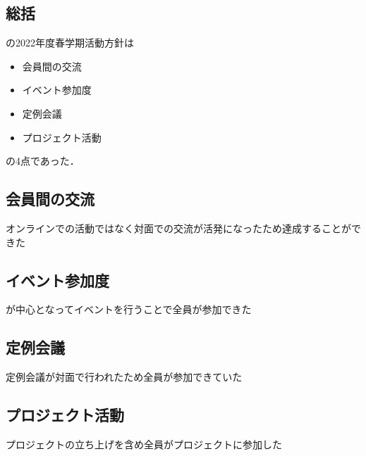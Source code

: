 \subsection*{\secondGrade{}総括}


\secondGrade{}の2022年度春学期活動方針は
\begin{itemize}
    \item 会員間の交流
    \item イベント参加度
    \item 定例会議
    \item プロジェクト活動
\end{itemize}
の4点であった．

\subsection*{会員間の交流}
オンラインでの活動ではなく対面での交流が活発になったため達成することができた

\subsection*{イベント参加度}
\secondGrade{}が中心となってイベントを行うことで全員が参加できた

\subsection*{定例会議}
定例会議が対面で行われたため全員が参加できていた

\subsection*{プロジェクト活動}
プロジェクトの立ち上げを含め全員がプロジェクトに参加した
